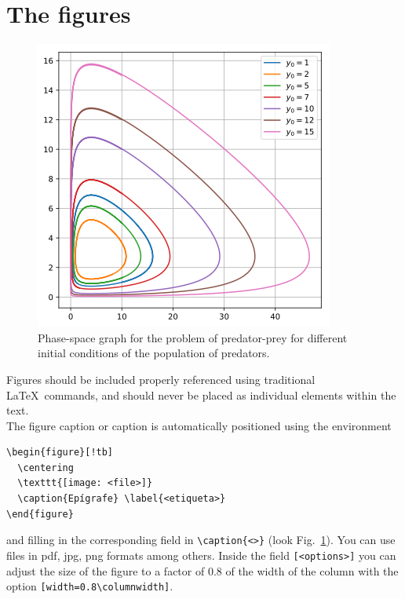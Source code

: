 \documentclass[eng]{MMSB-class-eng}
\begin{document}
\section{The figures}

\begin{figure}[!tb] 
 \centering
 \includegraphics[width=0.8\columnwidth]{figura1} 
 \caption{Phase-space graph for the problem of predator-prey for different initial conditions of the population of predators.} \label{fig-1}
\end{figure}

Figures should be included properly referenced using traditional \LaTeX\ commands, and should never be placed as individual elements within the text.\\

The figure caption or caption is automatically positioned using the environment
\begin{verbatim}
\begin{figure}[!tb]
  \centering
  \texttt{[image: <file>]}
  \caption{Epígrafe} \label{<etiqueta>}
\end{figure}
\end{verbatim}

and filling in the corresponding field in \verb!\caption{<>}! (look Fig.~\ref{fig-1}). You can use files in pdf, jpg, png formats among others. Inside the field \verb![<options>]! you can adjust the size of the figure to a factor of 0.8 of the width of the column with the option \verb![width=0.8\columnwidth]!.\\
\end{document}

